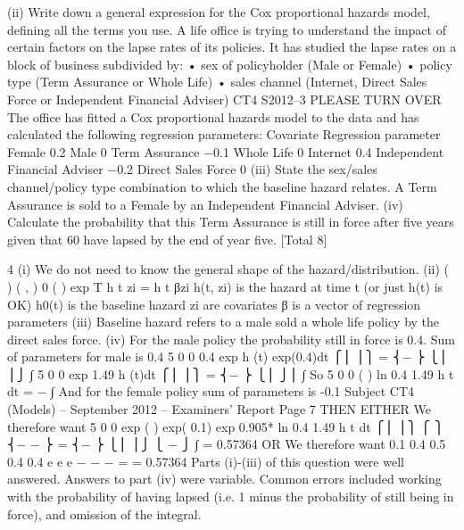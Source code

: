 (ii) Write down a general expression for the Cox proportional hazards model,
defining all the terms you use. 
A life office is trying to understand the impact of certain factors on the lapse rates of
its policies. It has studied the lapse rates on a block of business subdivided by:
  • sex of policyholder (Male or Female)
• policy type (Term Assurance or Whole Life)
• sales channel (Internet, Direct Sales Force or Independent Financial Adviser)
CT4 S2012–3 PLEASE TURN OVER
The office has fitted a Cox proportional hazards model to the data and has calculated
the following regression parameters:
  Covariate Regression parameter
Female 0.2
Male 0
Term Assurance −0.1
Whole Life 0
Internet 0.4
Independent Financial Adviser −0.2
Direct Sales Force 0
(iii) State the sex/sales channel/policy type combination to which the baseline
hazard relates. 
A Term Assurance is sold to a Female by an Independent Financial Adviser.
(iv) Calculate the probability that this Term Assurance is still in force after five
years given that 60%
have lapsed by the end of year five. 
[Total 8]

  4
(i) We do not need to know the general shape of the hazard/distribution.
(ii) ( ) ( , ) 0 ( ) exp T
h t zi = h t βzi
h(t, zi) is the hazard at time t (or just h(t) is OK)
h0(t) is the baseline hazard
zi are covariates
β is a vector of regression parameters
(iii) Baseline hazard refers to a male sold a whole life policy by the direct sales force.
(iv) For the male policy
the probability still in force is 0.4.
Sum of parameters for male is 0.4
5
0
0
0.4 exp h (t) exp(0.4)dt
⎧⎪ ⎪⎫ = ⎨− ⎬
⎩⎪ ⎪⎭
∫
5
0
0
exp 1.49 h (t)dt
⎧⎪ ⎪⎫ = ⎨− ⎬
⎩⎪ ⎭⎪
∫
So
5
0
0
( ) ln 0.4
1.49
h t dt =
  − ∫
And for the female policy sum of parameters is -0.1
Subject CT4 (Models) – September 2012 – Examiners’ Report
Page 7
THEN EITHER
We therefore want
5
0
0
exp ( ) exp( 0.1) exp 0.905* ln 0.4
1.49
h t dt
⎧⎪ ⎪⎫ ⎧ ⎫ ⎨− − ⎬ = ⎨− ⎬ ⎩⎪ ⎪⎭ ⎩ − ⎭
∫
= 0.57364
OR
We therefore want{ } 0.1
0.4 0.5 0.4 0.4
e
e e
−
− −
= = 0.57364
Parts (i)-(iii) of this question were well answered. Answers to part (iv) were variable.
Common errors included working with the probability of having lapsed (i.e. 1 minus the
                                                                      probability of still being in force), and omission of the integral.



